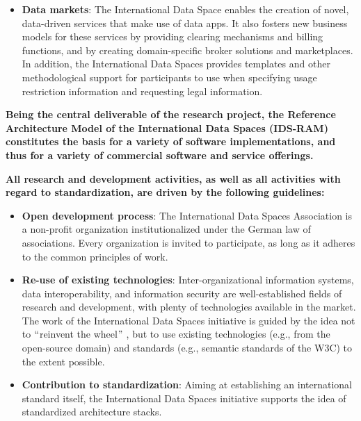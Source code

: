 \begin{itemize}
	\item \textbf{Data markets}: The International Data Space enables the creation of novel, data-driven services that make use of data apps. It also fosters new business models for these services by providing clearing mechanisms and billing functions, and by creating domain-specific broker solutions and marketplaces. In addition, the International Data Spaces provides templates and other methodological support for participants to use when specifying usage restriction information and requesting legal information. 

\end{itemize}

\textbf{Being the central deliverable of the research project, the Reference Architecture Model of the International Data Spaces (IDS-RAM) constitutes the basis for a variety of software implementations, and thus for a variety of commercial software and service offerings.}


\textbf{All research and development activities, as well as all activities with regard to standardization, are driven by the following guidelines:}

\begin{itemize}

	\item \textbf{Open development process}: The International Data Spaces Association is a non-profit organization institutionalized under the German law of associations. Every organization is invited to participate, as long as it adheres to the common principles of work.

	\item \textbf{Re-use of existing technologies}: Inter-organizational information systems, data interoperability, and information security are well-established fields of research and development, with plenty of technologies available in the market. The work of the International Data Spaces initiative is guided by the idea not to $``$reinvent the wheel$"$ , but to use existing technologies (e.g., from the open-source domain) and standards (e.g., semantic standards of the W3C) to the extent possible.

	\item \textbf{Contribution to standardization}: Aiming at establishing an international standard itself, the International Data Spaces initiative supports the idea of standardized architecture stacks.

\end{itemize}


